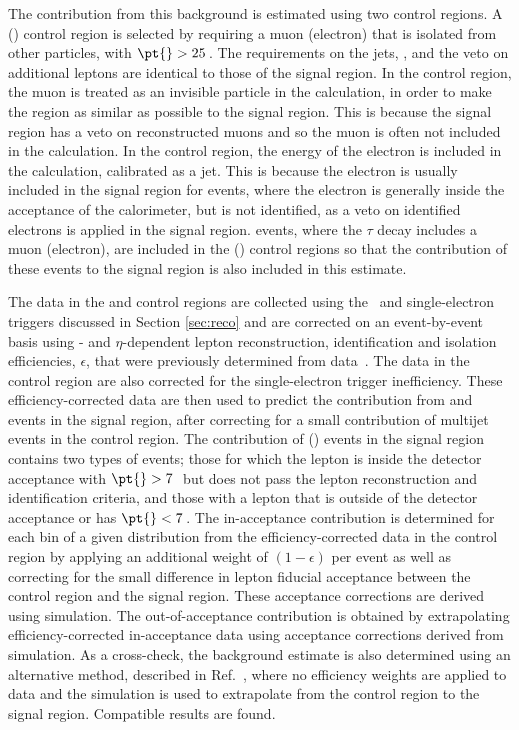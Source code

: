 \documentclass[cernpreprint,txfonts,UKenglish,texlive=2016]{\ATLASLATEXPATH atlasdoc}
\begin{document}
The contribution from this background is estimated using two \W{} control regions. A \Wmunu{} (\Wenu) control region is
selected by requiring a muon (electron) that is isolated from other
particles, with $\pt{} > 25$\,\GeV. 
The requirements on the jets, \ptmiss{}, and the veto on additional
leptons are identical to
those of the \ptmissjet{} signal region.
In the \Wmunu{} control region, the muon is treated as an invisible particle in
the \ptmiss{} calculation, in order to make the region as similar as
possible to the signal region. This is because the signal region has a
veto on reconstructed muons and so the muon is often not included in
the \ptmiss{} calculation.
In the \Wenu{} control region, the energy of the electron is
included in the \ptmiss{} calculation, calibrated as a jet. This is
because the electron is usually
included in the signal region for \Wenu{} events, where the electron is
generally inside the acceptance of the calorimeter, but is not
identified, as a veto on identified electrons is applied in the
signal region.
\Wtaunu{} events, where the $\tau$ decay includes a muon (electron), are included in the
\Wmunu{} (\Wenu{}) control regions so that the contribution of these
events to the signal region is also included in this estimate.

The data in the \Wmunu{} and \Wenu control regions are collected using the \ptmiss\ 
and single-electron triggers discussed in Section \ref{sec:reco} and are corrected on an event-by-event basis  
using \pt- and $\eta$-dependent lepton reconstruction, identification and isolation efficiencies, $\epsilon$, 
that were previously determined from data~\cite{PERF-2015-10,PERF-2016-01}. The data in 
the \Wenu control region are also corrected for the single-electron trigger inefficiency. 
These efficiency-corrected data are then used to predict the contribution from
\Wmunu{} and \Wenu{} events in the signal region, after correcting for
a small contribution of multijet events in the control region. 
The contribution of \Wmunu{} (\Wenu) events in the signal region
contains two types of events; those for which the lepton is inside the
detector acceptance with $\pt{} > 7$\,\GeV\ but does not pass the lepton 
reconstruction and identification criteria,
and those with a lepton that is outside of the detector acceptance or
has $\pt{} < 7$\,\GeV. The in-acceptance contribution is determined for
each bin of a given distribution from the efficiency-corrected data in
the control region by applying an additional weight of 
$\left( 1 -  \epsilon\right)$ per event as well as correcting for the small
difference in lepton fiducial acceptance between the control region and
the signal region. These acceptance corrections are derived using
simulation.
The out-of-acceptance contribution is obtained by extrapolating
efficiency-corrected in-acceptance data using acceptance corrections
derived from simulation.
As a cross-check, the \W{} background estimate is also determined using an alternative
method, described in Ref.~\cite{EXOT-2015-03}, where no
efficiency weights are applied to data and the simulation is used to extrapolate from 
the control region to the signal region. Compatible results are found.
\end{document}

